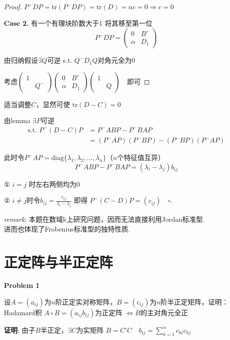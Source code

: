 \begin{enumerate}
\begin{proof}
$P^{-}DP=\mathrm{tr}(P^{-}DP) = \mathrm{tr}(D) = nc=0 \Rightarrow c=0$

\textbf{Case 2.} 有一个有理块阶数大于1
将其移至第一位
\[P^{-}DP = \begin{pmatrix} 0 & B' \\ \alpha & D_1 \end{pmatrix}\]

由归纳假设$\exists Q$可逆 s.t. $Q^-D_1Q$对角元全为0

考虑$\begin{pmatrix} 1 & \\ & Q^- \end{pmatrix} \begin{pmatrix} 0 & B' \\ \alpha & D_1 \end{pmatrix} \begin{pmatrix} 1 & \\ & Q \end{pmatrix} \quad 即可$
\end{proof}

适当调整$C$，显然可使 $\mathrm{tr}(D-C)=0$

由lemma $\exists P$可逆
\begin{align*}
\text{s.t. } P^-(D-C)P &= P^-ABP - P^-BAP \\
&= (P^-AP)(P^-BP) - (P^-BP)(P^-AP)
\end{align*}

此时令$P^-AP=\mathrm{diag}\{\lambda_1,\lambda_2,\dots,\lambda_n\}$（$n$个特征值互异）
\[P^-ABP - P^-BAP = (\lambda_i-\lambda_j)b_{ij}\]

① $i=j$ 时左右两侧均为0

② $i\neq j时 令b_{ij} =\frac{c_{ij}}{\lambda_i-\lambda_j}$ 即得 $P^-(C-D)P=(c_{ij}) \quad \square.$

\textit{remark}: 本题在数域$\mathbb{k}$上研究问题，因而无法直接利用Jordan标准型.\\
\quad 进而也体现了Frobenius标准型的独特性质.
\section{正定阵与半正定阵}
\textbf{Problem 1}

设$A=(a_{ij})$为$n$阶正定实对称矩阵，$B=(c_{ij})$为$n$阶半正定矩阵，证明：Hadamard积 $A \circ B = (a_{ij} b_{ij})$为正定阵
$\iff B$的主对角元全正


\textbf{证明}: 由子$B$半正定，$\exists C$为实矩阵 $B=C'C \quad b_{ij} = \sum\limits_{k=1}^n c_{ki} c_{kj}$


\end{enumerate}
